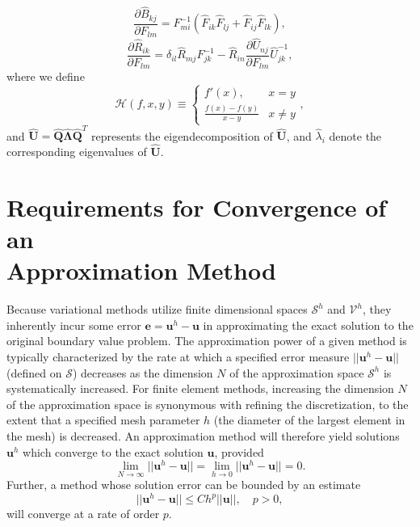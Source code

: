 	\begin{equation}
		\frac{\partial \hat{B}_{kj}}{\partial F_{lm}} = F^{-1}_{mi} (\hat{F}_{ik} \hat{F}_{lj} + \hat{F}_{ij} \hat{F}_{lk}),
	\end{equation}
	\begin{equation}
		\frac{\partial \hat{R}_{ik}}{\partial F_{lm}} = \delta_{il} \hat{R}_{mj} F^{-1}_{jk} - \hat{R}_{in} \frac{\partial \hat{U}_{nj}}{\partial F_{lm}} \hat{U}_{jk}^{-1},
	\end{equation}
	where we define
	\begin{equation}
		\mathcal{H} (f, x, y) \equiv \left\{ \begin{array}{cc} f'(x), & x = y \\
		\frac{f(x) - f(y)}{x - y} & x \neq y \end{array} \right. ,
	\end{equation}
	and $\hat{\mathbf{U}} = \hat{\mathbf{Q}} \hat{\boldsymbol{\Lambda}} \hat{\mathbf{Q}}^T$ represents the eigendecomposition of $\hat{\mathbf{U}}$, and $\hat{\lambda}_i$ denote the corresponding eigenvalues of $\hat{\mathbf{U}}$.

\section{Requirements for Convergence of an \\ Approximation Method}

Because variational methods utilize finite dimensional spaces $\mathcal{S}^h$ and $\mathcal{V}^h$, they inherently incur some error $\mathbf{e} = \mathbf{u}^h - \mathbf{u}$ in approximating the exact solution to the original boundary value problem. The  approximation power of a given method is typically characterized by the rate at which a specified error measure $||\mathbf{u}^h - \mathbf{u}||$ (defined on $\mathcal{S}$) decreases as the dimension $N$ of the approximation space $\mathcal{S}^h$ is systematically increased. For finite element methods, increasing the dimension $N$ of the approximation space is synonymous with refining the discretization, to the extent that a specified mesh parameter $h$ (the diameter of the largest element in the mesh) is decreased. An approximation method will therefore yield solutions $\mathbf{u}^h$ which converge to the exact solution $\mathbf{u}$, provided
\begin{equation}
	\lim_{N \rightarrow \infty} ||\mathbf{u}^h - \mathbf{u}|| = \lim_{h \rightarrow 0} ||\mathbf{u}^h - \mathbf{u}|| = 0.
\end{equation}
Further, a method whose solution error can be bounded by an estimate
\begin{equation}
	||\mathbf{u}^h - \mathbf{u}|| \leq C h^p ||\mathbf{u}||, \quad p > 0,
\end{equation}
will converge at a rate of order $p$.

